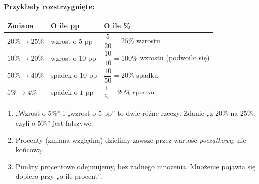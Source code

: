 \documentclass[11pt,a4paper]{article}
\begin{document}
\vspace{0.1em}
\textbf{Przykłady rozstrzygnięte:}
\begin{center}
\renewcommand{\arraystretch}{1.7}
\begin{tabular}{@{}lll@{}}
\toprule
Zmiana & O ile pp & O ile \% \\
\midrule
$20\%\to 25\%$ & wzrost o $5$ pp & $\dfrac{5}{20}=25\%$ wzrostu \\[9pt]
$10\%\to 20\%$ & wzrost o $10$ pp & $\dfrac{10}{10}=100\%$ wzrostu (podwoiło się) \\[9pt]
$50\%\to 40\%$ & spadek o $10$ pp & $\dfrac{10}{50}=20\%$ spadku \\[9pt]
$5\%\to 4\%$ & spadek o $1$ pp & $\dfrac{1}{5}=20\%$ spadku \\
\bottomrule
\end{tabular}
\end{center}

\begin{pulapka}
\begin{enumerate}[leftmargin=*, itemsep=2pt]
  \item „Wzrost o $5\%$” i „wzrost o $5$ pp” to dwie różne rzeczy. Zdanie „z $20\%$ na $25\%$, czyli o $5\%$” jest fałszywe.
  \item Procenty (zmiana względna) dzielimy zawsze przez wartość \emph{początkową}, nie końcową.
  \item Punkty procentowe odejmujemy, bez żadnego mnożenia. Mnożenie pojawia się dopiero przy „o ile procent”.
\end{enumerate}
\end{pulapka}
\end{document}

